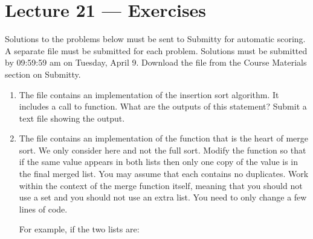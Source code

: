 \documentclass[letterpaper,10pt,english]{sphinxmanual}
\begin{document}
\chapter{Lecture 21 — Exercises}
\label{\detokenize{lecture_notes/lec21_sorting_exercises/exercises:lecture-21-exercises}}\label{\detokenize{lecture_notes/lec21_sorting_exercises/exercises::doc}}
Solutions to the problems below must be sent to Submitty for
automatic scoring. A separate file must be submitted for each problem.
Solutions must be submitted by 09:59:59 am on Tuesday, April 9. Download
the file  from the Course Materials section on Submitty.
\begin{enumerate}
\def\theenumi{\arabic{enumi}}
\def\labelenumi{\theenumi .}
\makeatletter\def\p@enumii{\p@enumi \theenumi .}\makeatother
\item {} 
The file  contains an implementation of the
insertion sort algorithm. It includes a call to  function.
What are the outputs of this statement? Submit a text file
showing the output.

\item {} 
The file  contains an implementation of the
 function that is the heart of merge sort.  We only
consider  here and not the full sort. Modify the 
function so that if the same value appears in both lists then only
one copy of the value is in the final merged list. You may assume
that each contains no duplicates. Work within the context of the
merge function itself, meaning that you should not use a set and
you should not use an extra list. You need to only change a few
lines of code.

For example, if the two lists are:

\begin{sphinxVerbatim}[commandchars=\\\{\}]
  \PYG{p}{[}       \PYG{p}{]}
  \PYG{p}{[}          \PYG{p}{]}
\end{sphinxVerbatim}


\end{enumerate}
\end{document}
